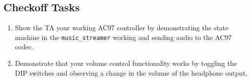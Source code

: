 \documentclass[11pt]{article}
\begin{document}
\subsection{Checkoff Tasks}

\begin{enumerate}
	\item Show the TA your working AC97 controller by demonstrating the state machine in the \verb|music_streamer| working and sending audio to the AC97 codec.
	\item Demonstrate that your volume control functionality works by toggling the DIP switches and observing a change in the volume of the headphone output.
\end{enumerate}
\end{document}
